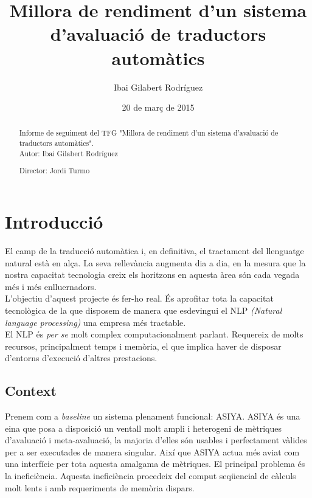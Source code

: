 \documentclass[11pt,a4paper]{article}
\begin{document}
\title{Millora de rendiment d'un sistema d'avaluació de traductors automàtics}
\author{Ibai Gilabert Rodríguez}
\date{20 de març de 2015}
\maketitle
\newpage

\begin{abstract}
Informe de seguiment del TFG "Millora de rendiment d'un sistema d'avaluació de traductors automàtics".
\\

Autor: Ibai Gilabert Rodríguez

Director: Jordi Turmo
\end{abstract}
\newpage

\tableofcontents
\newpage

\section{Introducció}

El camp de la traducció automàtica i, en definitiva, el tractament del llenguatge natural està en alça. La seva rellevància augmenta dia a dia, en la mesura que la nostra capacitat tecnologia creix els horitzons en aquesta àrea són cada vegada més i més enlluernadors.
\\

L'objectiu d'aquest projecte és fer-ho real. És aprofitar tota la capacitat tecnològica de la que disposem de manera que esdevingui el NLP \textit{(Natural language processing)} una empresa més tractable.
\\

El NLP és \textit{per se} molt complex computacionalment parlant. Requereix de molts recursos, principalment temps i memòria, el que implica haver de disposar d'entorns d'execució d'altres prestacions.
\\

\subsection{Context}
Prenem com a \textit{baseline} un sistema plenament funcional: ASIYA\cite{asiya}. ASIYA és una eina que posa a disposició un ventall molt ampli i heterogeni de mètriques d'avaluació i meta-avaluació, la majoria d'elles són usables i perfectament vàlides per a ser executades de manera singular. Així que ASIYA actua més aviat com una interfície per tota aquesta amalgama de mètriques. El principal problema és la ineficiència. Aquesta ineficiència procedeix del comput seqüencial de càlculs molt lents i amb requeriments de memòria dispars.
\\
\end{document}
